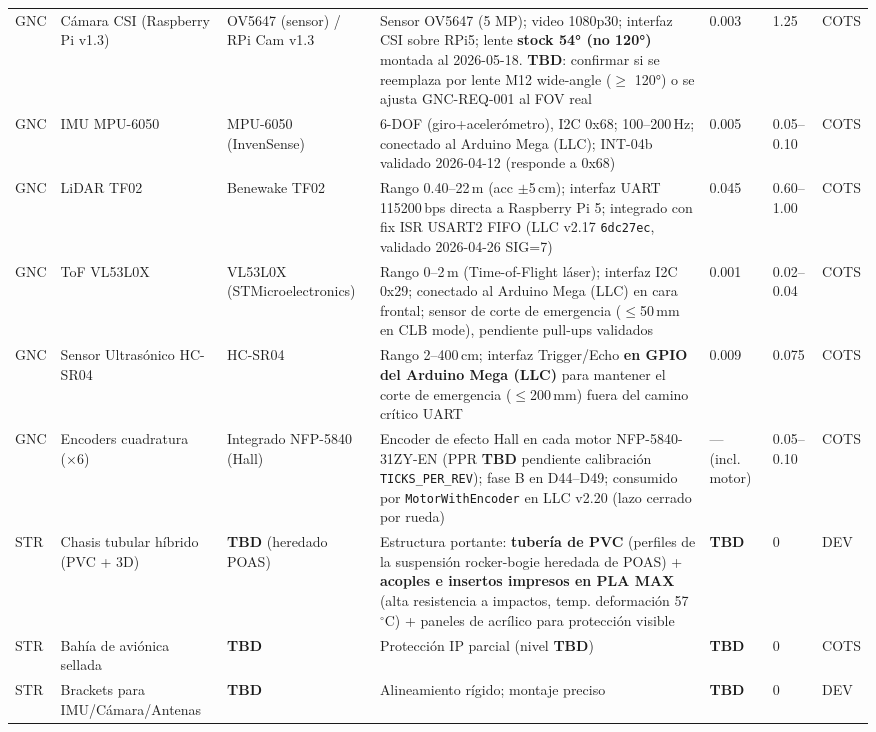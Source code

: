 \begin{table}[H]
{\begin{tabular}{p{1.9cm} p{4cm} p{3.2cm} p{4.5cm} p{1.7cm} p{1.7cm} p{1.6cm}}
GNC &
Cámara CSI (Raspberry Pi v1.3) &
OV5647 (sensor) / RPi Cam v1.3 &
Sensor OV5647 (5 MP); video 1080p30; interfaz CSI sobre RPi5; lente \textbf{stock 54° (no 120°)} montada al 2026-05-18. \textbf{TBD}: confirmar si se reemplaza por lente M12 wide-angle ($\ge$ 120°) o se ajusta GNC-REQ-001 al FOV real &
0.003 &
1.25 &
COTS
\\
GNC &
IMU MPU-6050 &
MPU-6050 (InvenSense) &
6-DOF (giro+acelerómetro), I2C 0x68; 100--200\,Hz; conectado al Arduino Mega (LLC); INT-04b validado 2026-04-12 (responde a 0x68) &
0.005 &
0.05--0.10 &
COTS
\\
GNC &
LiDAR TF02 &
Benewake TF02 &
Rango 0.40--22\,m (acc $\pm$5\,cm); interfaz UART 115200\,bps directa a Raspberry Pi 5; integrado con fix ISR USART2 FIFO (LLC v2.17 \texttt{6dc27ec}, validado 2026-04-26 SIG=7) &
0.045 &
0.60--1.00 &
COTS
\\
GNC &
ToF VL53L0X &
VL53L0X (STMicroelectronics) &
Rango 0--2\,m (Time-of-Flight láser); interfaz I2C 0x29; conectado al Arduino Mega (LLC) en cara frontal; sensor de corte de emergencia ($\le$50\,mm en CLB mode), pendiente pull-ups validados &
0.001 &
0.02--0.04 &
COTS
\\
GNC &
Sensor Ultrasónico HC-SR04 &
HC-SR04 &
Rango 2--400\,cm; interfaz Trigger/Echo \textbf{en GPIO del Arduino Mega (LLC)} para mantener el corte de emergencia ($\le$200\,mm) fuera del camino crítico UART &
0.009 &
0.075 &
COTS
\\
GNC &
Encoders cuadratura (×6) &
Integrado NFP-5840 (Hall) &
Encoder de efecto Hall en cada motor NFP-5840-31ZY-EN (PPR \textbf{TBD} pendiente calibración \texttt{TICKS\_PER\_REV}); fase B en D44--D49; consumido por \texttt{MotorWithEncoder} en LLC v2.20 (lazo cerrado por rueda) &
--- (incl. motor) &
0.05--0.10 &
COTS
\\

STR &
Chasis tubular híbrido (PVC + 3D) &
\textbf{TBD} (heredado POAS) &
Estructura portante: \textbf{tubería de PVC} (perfiles de la suspensión rocker-bogie heredada de POAS) + \textbf{acoples e insertos impresos en PLA MAX} (alta resistencia a impactos, temp. deformación 57\,$^{\circ}$C) + paneles de acrílico para protección visible &
\textbf{TBD} &
0 &
DEV
\\
STR &
Bahía de aviónica sellada &
\textbf{TBD} &
Protección IP parcial (nivel \textbf{TBD}) &
\textbf{TBD} &
0 &
COTS
\\
STR &
Brackets para IMU/Cámara/Antenas &
\textbf{TBD} &
Alineamiento rígido; montaje preciso &
\textbf{TBD} &
0 &
DEV
\\

\hline
\end{tabular}}
\end{table}

